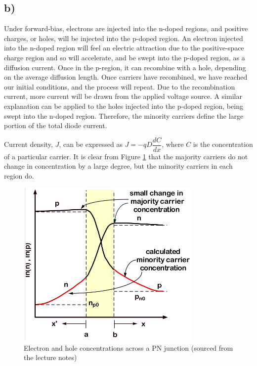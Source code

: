 \subsection*{b)}
	Under forward-bias, electrons are injected into the n-doped regions, and positive charges, or holes, 
	will be injected into the p-doped region. An electron injected into the n-doped region will feel an electric attraction due to the positive-space charge region and so will accelerate, and be swept into the p-doped region, as a diffusion current. Once in the p-region, it can recombine with a hole, depending on the average diffusion length. Once carriers have recombined, we have reached our initial conditions, and the process will repeat. Due to the recombination current, more current will be drawn from the applied voltage source. A similar explanation can be applied to the holes injected into the p-doped region, being swept into the n-doped region. Therefore, the minority carriers define the large portion of the total diode current.
	
	Current density, $J$, can be expressed as $J = -q D \dfrac{d C}{d x}$, where $C$ is the concentration of a particular carrier. It is clear from Figure \ref{fig::concentration} that the majority carriers do not change in concentration by a large degree, but the minority carriers in each region do. 
	
	\begin{figure}[!htbp]
		\centering
		\includegraphics[width=0.8\textwidth]{./img/2b_concentration}
		\caption{Electron and hole concentrations across a PN junction (sourced from the lecture notes)}
		\label{fig::concentration}
	\end{figure}
	
